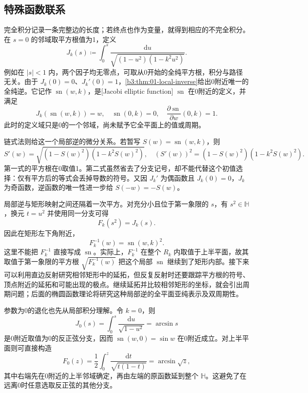 \subsection{特殊函数联系}
\label{b3:subsec:070404}

完全积分记录一条完整边的长度；若终点也作为变量，就得到相应的不完全积分。在 \(s=0\) 的邻域取平方根值为1，定义
\[
 J_k(s)\coloneqq\int_0^s
 \frac{\mathrm{d}u}{\sqrt{(1-u^2)(1-k^2u^2)}}.
\]
例如在 \(|s|<1\) 内，两个因子均无零点，可取从0开始的全纯平方根，积分与路径无关。由于 \(J_k(0)=0\)、\(J_k'(0)=1\)，\cref{b3:thm:01-local-inverse}给出0附近唯一的全纯逆。它记作 \(\operatorname{sn}(w,k)\)，是[Jacobi elliptic function] \(\operatorname{sn}\) 在0附近的定义，并满足
\[
 J_k(\operatorname{sn}(w,k))=w,\quad
 \operatorname{sn}(0,k)=0,\quad
 \frac{\partial\operatorname{sn}}{\partial w}(0,k)=1.
\]
此时的定义域只是0的一个邻域，尚未赋予它全平面上的值或周期。

\ProseParagraphBreak

链式法则给这一个局部逆的微分关系。若暂写 \(S(w)=\operatorname{sn}(w,k)\)，则
\[
 S'(w)=\sqrt{(1-S(w)^2)(1-k^2S(w)^2)},\quad
 (S'(w))^2=(1-S(w)^2)(1-k^2S(w)^2).
\]
第一式的平方根在0取值1。第二式虽然省去了分支记号，却不能代替这个初值选择：仅有平方后的等式会丢掉导数的符号。又因 \(J_k'\) 为偶函数且 \(J_k(0)=0\)，\(J_k\) 为奇函数，逆函数的唯一性进一步给 \(S(-w)=-S(w)\)。

\ProseParagraphBreak

局部逆与矩形映射之间还隔着一次平方。对充分小且位于第一象限的 \(s\)，有 \(s^2\in\mathbb H\)，换元 \(t=u^2\) 并使用同一分支可得
\[
 F_k(s^2)=J_k(s).
\]
因此在矩形左下角附近，
\[
 F_k^{-1}(w)=\operatorname{sn}(w,k)^2.
\]
这里不能把 \(F_k^{-1}\) 直接写成 \(\operatorname{sn}\)。实际上，\(F_k^{-1}\) 在整个 \(R_k\) 内取值于上半平面，故其取值于第一象限的平方根
\(\sqrt{F_k^{-1}(w)}\)
把这个局部 \(\operatorname{sn}\) 继续到了矩形内部。接下来可以利用直边反射研究相邻矩形中的延拓，但反复反射时还要跟踪平方根的符号、顶点附近的延拓和可能出现的极点。继续延拓并比较相邻矩形的坐标，就会引出周期问题；后面的椭圆函数理论将研究这种局部逆的全平面亚纯表示及双周期性。

\ProseParagraphBreak

参数为0的退化也先从局部积分理解。令 \(k=0\)，则
\[
 J_0(s)=\int_0^s\frac{\mathrm{d}u}{\sqrt{1-u^2}}
 =\arcsin s
\]
是0附近取值为0的反正弦分支，因而 \(\operatorname{sn}(w,0)=\sin w\) 在0附近成立。对上半平面则可直接构造
\[
 F_0(z)=\frac12\int_0^z\frac{\mathrm{d}t}{\sqrt{t(1-t)}}
 =\arcsin\sqrt z,
\]
其中右端先在0附近的上半邻域确定，再由左端的原函数延到整个 \(\mathbb H\)。这避免了在远离0时任意选取反正弦的其他分支。

